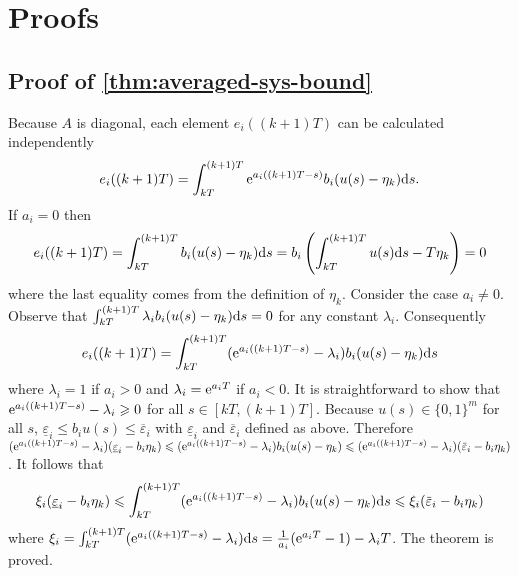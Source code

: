 \section{Proofs}

\subsection{Proof of \protect\cref{thm:averaged-sys-bound}}
\label{sec:proof:averaged-sys-bound}

  Because $A$ is diagonal, each element $e_i ((k + 1) T)$ can be calculated
  independently
  \[ e_i ((k + 1) T) = \int_{kT}^{(k + 1) T} \mathrm{e}^{a_i ((k + 1) T - s)} b_i 
     (u (s) - \eta_k) \mathrm{d} s \text{.} \]
  If $a_i = 0$ then
  \[ e_i ((k + 1) T) = \int_{kT}^{(k + 1) T} b_i  (u (s) - \eta_k) \mathrm{d} s =
     b_i  \left( \int_{kT}^{(k + 1) T} u (s) \mathrm{d} s - T \eta_k \right) = 0
  \]
  where the last equality comes from the definition of $\eta_k$. Consider the
  case $a_i \neq 0$. Observe that $\int_{kT}^{(k + 1) T} \lambda_i b_i  (u (s)
  - \eta_k) \mathrm{d} s = 0$ for any constant $\lambda_i$. Consequently
  \[ e_i ((k + 1) T) = \int_{kT}^{(k + 1) T} (\mathrm{e}^{a_i ((k + 1) T - s)} -
     \lambda_i ) b_i  (u (s) - \eta_k) \mathrm{d} s \]
  where $\lambda_i = 1$ if $a_i > 0$ and $\lambda_i = \mathrm{e}^{a_i T}$ if $a_i
  < 0$. It is straightforward to show that $\mathrm{e}^{a_i ((k + 1) T - s)} -
  \lambda_i \geqslant 0$ for all $s \in [kT, (k + 1) T]$. Because $u (s) \in
  \{ 0, 1 \}^m$ for all $s$, $\underline{\varepsilon}_i \leqslant b_i u (s)
  \leqslant \overbar{\varepsilon}_i$ with $\underline{\varepsilon}_i$ and
  $\overbar{\varepsilon}_i$ defined as above. Therefore $(\mathe^{a_i ((k +
  1) T - s)} - \lambda_i )  (\underline{\varepsilon}_i - b_i \eta_k) \leqslant
  (\mathe^{a_i ((k + 1) T - s)} - \lambda_i ) b_i  (u (s) - \eta_k) \leqslant
  (\mathe^{a_i ((k + 1) T - s)} - \lambda_i )  (\overbar{\varepsilon}_i - b_i
  \eta_k)$. It follows that
  \[ \xi_i  (\underline{\varepsilon}_i - b_i \eta_k) \leqslant \int_{kT}^{(k +
     1) T} (\mathe^{a_i ((k + 1) T - s)} - \lambda_i ) b_i  (u (s) - \eta_k)
     \mathd s \leqslant \xi_i  (\overbar{\varepsilon}_i - b_i \eta_k) \]
  where $\xi_i = \int_{kT}^{(k + 1) T} (\mathrm{e}^{a_i ((k + 1) T - s)} -
  \lambda_i ) \mathrm{d} s = \frac{1}{a_i} (\mathrm{e}^{a_i T} - 1) - \lambda_i T$.
  The theorem is proved.



